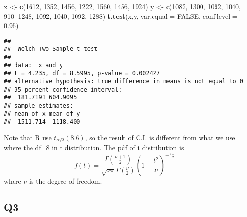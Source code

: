 \documentclass[
]{book}
\newenvironment{Shaded}{\begin{snugshade}}{\end{snugshade}}
\newcommand{\DataTypeTok}[1]{\textcolor[rgb]{0.13,0.29,0.53}{#1}}
\newcommand{\DecValTok}[1]{\textcolor[rgb]{0.00,0.00,0.81}{#1}}
\newcommand{\FloatTok}[1]{\textcolor[rgb]{0.00,0.00,0.81}{#1}}
\newcommand{\KeywordTok}[1]{\textcolor[rgb]{0.13,0.29,0.53}{\textbf{#1}}}
\newcommand{\NormalTok}[1]{#1}
\newcommand{\OtherTok}[1]{\textcolor[rgb]{0.56,0.35,0.01}{#1}}
\newcommand{\StringTok}[1]{\textcolor[rgb]{0.31,0.60,0.02}{#1}}
\theoremstyle{definition}
\theoremstyle{definition}
\theoremstyle{definition}
\theoremstyle{remark}
\begin{document}
\begin{Shaded}
\begin{Highlighting}[]
\NormalTok{x <-}\StringTok{ }\KeywordTok{c}\NormalTok{(}\DecValTok{1612}\NormalTok{, }\DecValTok{1352}\NormalTok{, }\DecValTok{1456}\NormalTok{, }\DecValTok{1222}\NormalTok{, }\DecValTok{1560}\NormalTok{, }\DecValTok{1456}\NormalTok{, }\DecValTok{1924}\NormalTok{)}
\NormalTok{y <-}\StringTok{ }\KeywordTok{c}\NormalTok{(}\DecValTok{1082}\NormalTok{, }\DecValTok{1300}\NormalTok{, }\DecValTok{1092}\NormalTok{, }\DecValTok{1040}\NormalTok{, }\DecValTok{910}\NormalTok{, }\DecValTok{1248}\NormalTok{, }\DecValTok{1092}\NormalTok{, }\DecValTok{1040}\NormalTok{, }\DecValTok{1092}\NormalTok{, }\DecValTok{1288}\NormalTok{)}
\KeywordTok{t.test}\NormalTok{(x,y, }\DataTypeTok{var.equal =} \OtherTok{FALSE}\NormalTok{, }\DataTypeTok{conf.level =} \FloatTok{0.95}\NormalTok{)}
\end{Highlighting}
\end{Shaded}

\begin{verbatim}
## 
##  Welch Two Sample t-test
## 
## data:  x and y
## t = 4.235, df = 8.5995, p-value = 0.002427
## alternative hypothesis: true difference in means is not equal to 0
## 95 percent confidence interval:
##  181.7191 604.9095
## sample estimates:
## mean of x mean of y 
##  1511.714  1118.400
\end{verbatim}

Note that R use \(t_{\alpha/2}(8.6)\), so the result of C.I. is different from what we use where the df=8 in t distribution. The pdf of t distribution is
\begin{equation}
f(t)=\frac{\Gamma\left(\frac{\nu+1}{2}\right)}{\sqrt{\nu \pi} \Gamma\left(\frac{\nu}{2}\right)}\left(1+\frac{t^{2}}{\nu}\right)^{-\frac{\nu+1}{2}}
\end{equation}
where \(\nu\) is the degree of freedom.

\hypertarget{q3-3}{%
\subsection{Q3}\label{q3-3}}
\end{document}
